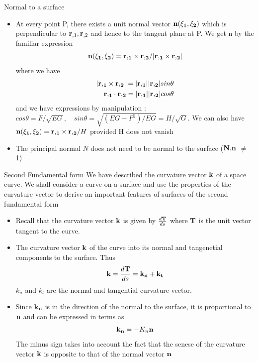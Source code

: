 	\begin{frame}{Normal to a surface}
		\begin{itemize}
			\item At every point P, there exists a unit normal vector $\mathbf{n(\xi_1,\xi_2)}$	 which is perpendicular to $\mathbf{r}_{,1},\mathbf{r}_{,2}$  and hence to the tangent plane at P. We get n by the familiar expression
			\begin{equation}
				\mathbf{n(\xi_1,\xi_2)}= \mathbf{r,_1} \times \mathbf{r,_2} / | \mathbf{r,_1} \times \mathbf{r,_2} |
			\end{equation}
			where we have 
			\begin{equation}
			\begin{aligned}
			| \mathbf{r,_1} \times \mathbf{r,_2} | = | \mathbf{r,_1}|| \mathbf{r,_2} | sin\theta \\
			 \mathbf{r,_1} \cdot \mathbf{r,_2}  = | \mathbf{r,_1}|| \mathbf{r,_2} | cos\theta
			\end{aligned}
			\end{equation}
			and we have expressions by manipulation : $ cos \theta = F/\sqrt{EG}, \quad sin \theta = \sqrt{(EG-F^2)/EG} = H/\sqrt{G}$. We can also have $\mathbf{n(\xi_1,\xi_2)}= \mathbf{r,_1} \times \mathbf{r,_2} / H$ provided H does not vanish
			\item The principal normal $N$ does  not need to be normal to the surface ($\mathbf{N.n}$ $\neq$ 1)
			
		\end{itemize}
	\end{frame}


	\begin{frame}{Second Fundamental form}
		We have described the curvature vector $\mathbf{k}$ of a space curve. We shall consider a curve on a surface and use the properties of the curvature vector to derive an important features of surfaces of the second fundamental form
		\begin{itemize}
			\item Recall that the curvature vector $\mathbf{k}$ is given by $\frac{d\mathbf{T}}{ds}$ where $\mathbf{T}$ is the unit vector tangent to the curve.
			\item The curvature vector $\mathbf{k}$ of the curve into its normal and tangenetial components to the surface. Thus
			\begin{equation}
			\mathbf{k} = \frac{d\mathbf{T}}{ds} = \mathbf{k_n+k_t}
			\end{equation}
			$k_n$ and $k_t$ are the normal and tangential curvature vector.
			\item Since $\mathbf{k_n}$ is in the direction of the normal to the surface, it is proportional to $\mathbf{n}$ and can be expressed in terms as
			\begin{equation}
				\mathbf{k_n} = - K_n \mathbf{n}
			\end{equation}
			The minus sign takes into account the fact that the senese of the curvature vector $\mathbf{k}$ is opposite to that of the normal vector $\mathbf{n}$
		\end{itemize}
	\end{frame}


